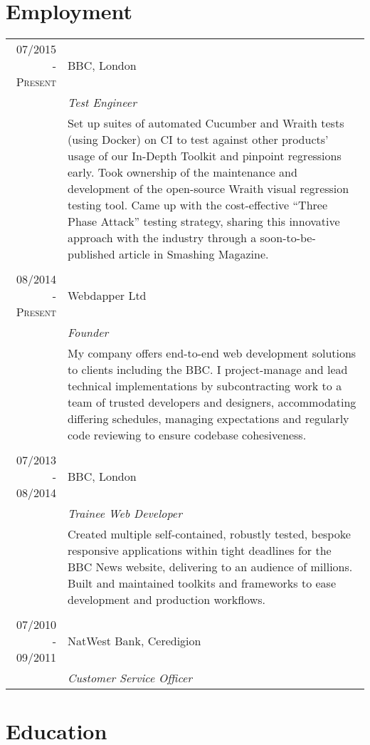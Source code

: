 \documentclass[class=article, crop=false]{standalone}
\begin{document}
\section{Employment}
\begin{tabular}{r|p{11cm}}
\textsc{07/2015 - Present} & BBC, London
\\&\emph{Test Engineer}
\\&\footnotesize{
Set up suites of automated Cucumber and Wraith tests (using Docker) on CI to test against other products' usage of our In-Depth Toolkit and pinpoint regressions early. Took ownership of the maintenance and development of the open-source Wraith visual regression testing tool. Came up with the cost-effective ``Three Phase Attack'' testing strategy, sharing this innovative approach with the industry through a soon-to-be-published article in Smashing Magazine.
}
\\\multicolumn{2}{c}{} \\
\textsc{08/2014 - Present} & Webdapper Ltd
\\&\emph{Founder}
\\&\footnotesize{My company offers end-to-end web development solutions to clients including the BBC. I project-manage and lead technical implementations by subcontracting work to a team of trusted developers and designers, accommodating differing schedules, managing expectations and regularly code reviewing to ensure codebase cohesiveness.}
\\\multicolumn{2}{c}{} \\
\textsc{07/2013 - 08/2014} & BBC, London
\\&\emph{Trainee Web Developer}
\\&\footnotesize{Created multiple self-contained, robustly tested, bespoke responsive applications within tight deadlines for the BBC News website, delivering to an audience of millions. Built and maintained toolkits and frameworks to ease development and production workflows.}
\\\multicolumn{2}{c}{} \\
\textsc{07/2010 - 09/2011} & NatWest Bank, Ceredigion
\\&\emph{Customer Service Officer}
\end{tabular}

\section{Education}
\end{document}
